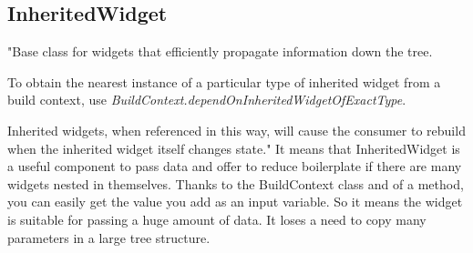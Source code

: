 \subsection{InheritedWidget}\label{subsec:inheritedwidget}
"Base class for widgets that efficiently propagate information down the tree.

To obtain the nearest instance of a particular type of inherited widget from a build context, use \textit{BuildContext.dependOnInheritedWidgetOfExactType}\cite{dependOnInheritedWidgetOfExactType}.

Inherited widgets, when referenced in this way, will cause the consumer to rebuild when the inherited widget itself changes state."\cite{inheritedWidget}
It means that InheritedWidget is a useful component to pass data and offer to reduce boilerplate if there are many widgets nested in themselves.
Thanks to the BuildContext class and of a method, you can easily get the value you add as an input variable.
So it means the widget is suitable for passing a huge amount of data. It loses a need to copy many parameters in a large tree structure.
